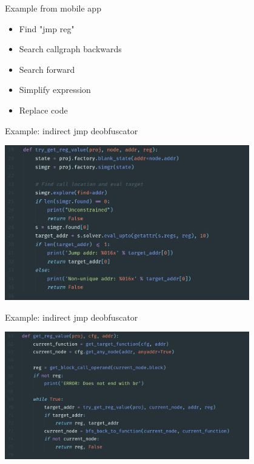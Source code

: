 \documentclass[10pt, compress]{beamer}
\begin{document}
\begin{frame}{Example from mobile app}
  \begin{itemize}
    \item Find "jmp reg"
    \item Search callgraph backwards
    \item Search forward
    \item Simplify expression
    \item Replace code
  \end{itemize}
\end{frame}

\begin{frame}{Example: indirect jmp deobfuscator}
\begin{center}
  \includegraphics[width=0.8\textwidth]{images/deobf-4-angr1.png}
 \end{center}
\end{frame}

\begin{frame}{Example: indirect jmp deobfuscator}
\begin{center}
  \includegraphics[width=0.8\textwidth]{images/deobf-5-angr2.png}
 \end{center}
\end{frame}
\end{document}
